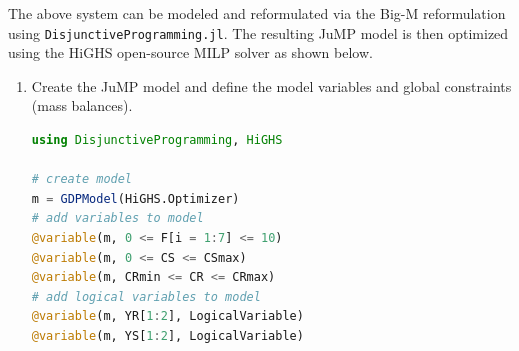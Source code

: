 \documentclass{juliacon}
\begin{document}
The above system can be modeled and reformulated via the Big-M reformulation using \verb|DisjunctiveProgramming.jl|. The resulting JuMP model is then optimized using the HiGHS open-source MILP solver \cite{huangfu2018parallelizing} as shown below.

\begin{enumerate}
    \item Create the JuMP model and define the model variables and global constraints (mass balances).
    
\begin{lstlisting}[language = Julia]
using DisjunctiveProgramming, HiGHS

# create model
m = GDPModel(HiGHS.Optimizer)
# add variables to model
@variable(m, 0 <= F[i = 1:7] <= 10)
@variable(m, 0 <= CS <= CSmax)
@variable(m, CRmin <= CR <= CRmax)
# add logical variables to model
@variable(m, YR[1:2], LogicalVariable)
@variable(m, YS[1:2], LogicalVariable)


\end{lstlisting}
\end{enumerate}
\end{document}
